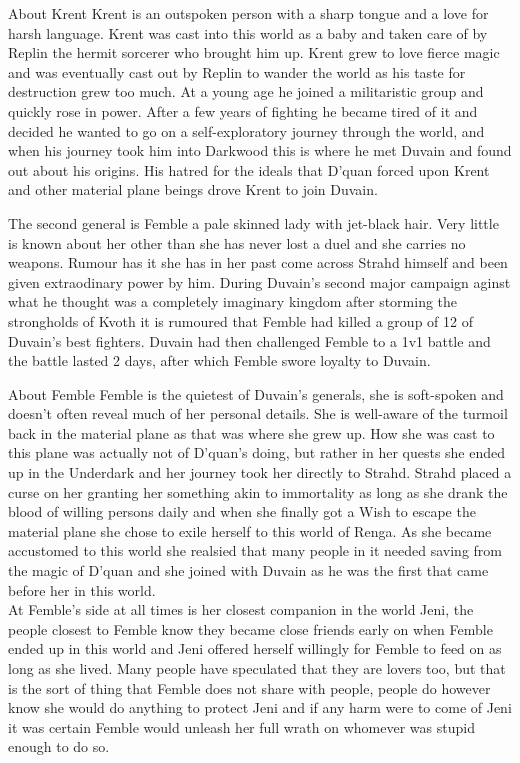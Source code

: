 \documentclass[10pt,twoside,twocolumn]{article}
\begin{document}
\begin{commentbox}{About Krent}
Krent is an outspoken person with a sharp tongue and a love for harsh language. Krent was cast into this world as a baby and taken care of by Replin the hermit sorcerer who brought him up. Krent grew to love fierce magic and was eventually cast out by Replin to wander the world as his taste for destruction grew too much. At a young age he joined a militaristic group and quickly rose in power. After a few years of fighting he became tired of it and decided he wanted to go on a self-exploratory journey through the world, and when his journey took him into Darkwood this is where he met Duvain and found out about his origins. His hatred for the ideals that D'quan forced upon Krent and other material plane beings drove Krent to join Duvain.
\end{commentbox}

The second general is Femble a pale skinned lady with jet-black hair. Very little is known about her other than she has never lost a duel and she carries no weapons. Rumour has it she has in her past come across Strahd himself and been given extraodinary power by him. During Duvain's second major campaign aginst what he thought was a completely imaginary kingdom after storming the strongholds of Kvoth it is rumoured that Femble had killed a group of 12 of Duvain's best fighters. Duvain had then challenged Femble to a 1v1 battle and the battle lasted 2 days, after which Femble swore loyalty to Duvain.\\

\begin{commentbox}{About Femble}
Femble is the quietest of Duvain's generals, she is soft-spoken and doesn't often reveal much of her personal details. She is well-aware of the turmoil back in the material plane as that was where she grew up. How she was cast to this plane was actually not of D'quan's doing, but rather in her quests she ended up in the Underdark and her journey took her directly to Strahd. Strahd placed a curse on her granting her something akin to immortality as long as she drank the blood of willing persons daily and when she finally got a Wish to escape the material plane she chose to exile herself to this world of Renga. As she became accustomed to this world she realsied that many people in it needed saving from the magic of D'quan and she joined with Duvain as he was the first that came before her in this world.\\

At Femble's side at all times is her closest companion in the world Jeni, the people closest to Femble know they became close friends early on when Femble ended up in this world and Jeni offered herself willingly for Femble to feed on as long as she lived. Many people have speculated that they are lovers too, but that is the sort of thing that Femble does not share with people, people do however know she would do anything to protect Jeni and if any harm were to come of Jeni it was certain Femble would unleash her full wrath on whomever was stupid enough to do so.
\end{commentbox}
\end{document}
